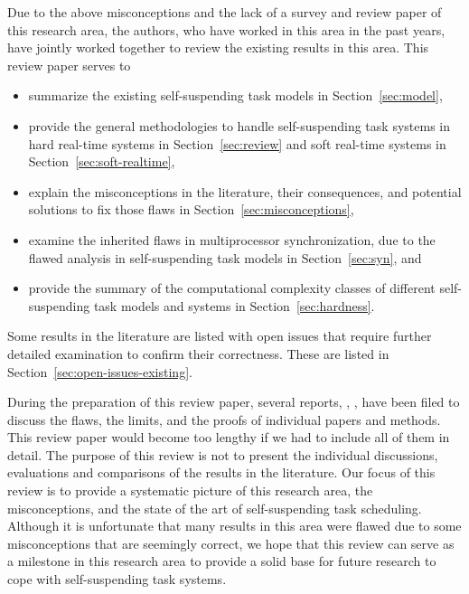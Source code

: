 \noindent Due to the above misconceptions and the lack of a survey and review paper of this research area, the authors, who have worked in this area in the past years, have jointly worked together to review the existing results in this area. This review paper serves to
\begin{itemize}
\item summarize the existing self-suspending task models in Section~\ref{sec:model}, 
\item provide the general methodologies to handle self-suspending task systems in hard real-time systems in Section~\ref{sec:review} and soft real-time systems in Section~\ref{sec:soft-realtime}, 
\item explain the misconceptions in the literature, their consequences, and potential solutions to fix those flaws in Section~\ref{sec:misconceptions}, 
\item examine the inherited flaws in multiprocessor synchronization, due to the flawed analysis in self-suspending task models in Section~\ref{sec:syn}, and
\item provide the summary of the computational complexity classes of different self-suspending task models and systems in Section~\ref{sec:hardness}.
\end{itemize}
Some results in the literature are listed with open issues that require further detailed examination to confirm their correctness. These are listed in Section~\ref{sec:open-issues-existing}. 

During the preparation of this review paper, several reports, \ie, \cite{ChenHuangNelissen,ChenBrandenburg,erratu-cong-anderson,BletsasReport2015}, have been filed to discuss the flaws, the limits, and the proofs of individual papers and methods. This review paper would become too lengthy if we had to include all of them in detail.  The purpose of this review is not to present the individual discussions, evaluations and comparisons of the results in the literature. Our focus of this review is to provide a systematic picture of this research area, the misconceptions, and the state of the art of self-suspending task scheduling. Although it is unfortunate that many results in this area were flawed due to some misconceptions that are seemingly correct, we hope that this review can serve as a milestone in this research area to provide a solid base for future research to cope with self-suspending task systems.









    
  

    
  
